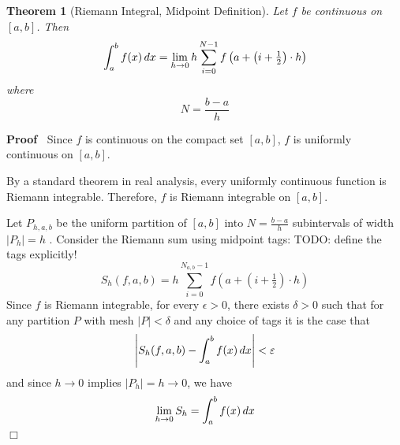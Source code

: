 \documentclass{article}
\newenvironment{proof}{\noindent\textbf{Proof\ }}{\hspace*{\fill}$\Box$\medskip}
\newtheorem{theorem}{Theorem}
\begin{document}
\begin{theorem}[Riemann Integral, Midpoint Definition]
  Let $f$ be continuous on $[a, b]$. Then
  \[ \int_a^b f (x)  \hspace{0.17em} dx = \lim_{h \to 0} h \sum_{i = 0}^{N -
     1} f \left( a + \left( i + \tfrac{1}{2} \right) \cdot h \right) \]
  where
  \begin{equation}
    N = \frac{b - a}{h}
  \end{equation}
\end{theorem}

\begin{proof}
  Since $f$ is continuous on the compact set $[a, b]$, $f$ is uniformly
  continuous on $[a, b]$.
  
  By a standard theorem in real analysis, every uniformly continuous function
  is Riemann integrable. Therefore, $f$ is Riemann integrable on $[a, b]$.
  
  Let $P_{h, a, b}$ be the uniform partition of $[a, b]$ into $N = \frac{b -
  a}{h}$ subintervals of width $|P_h | = h$ . Consider the Riemann sum using
  midpoint tags: TODO: define the tags explicitly!
  \begin{equation}
    S_h (f, a, b) = h \sum_{i = 0}^{N_{a, b} - 1} f \left( a + \left( i +
    \tfrac{1}{2} \right) \cdot h \right)
  \end{equation}
  Since $f$ is Riemann integrable, for every $\epsilon > 0$, there exists
  $\delta > 0$ such that for any partition $P$ with mesh $|P| < \delta$ and
  any choice of tags it is the case that
  \begin{equation}
    \left| S_h (f, a, b) - \int_a^b f (x) \hspace{0.17em} dx \right| <
    \varepsilon
  \end{equation}
  and since $h \to 0$ implies $|P_h | = h \to 0$, we have
  \[ \lim_{h \to 0} S_h = \int_a^b f (x)  \hspace{0.17em} dx \]
\end{proof}
\end{document}
